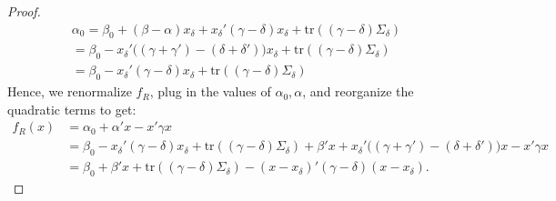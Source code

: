 \documentclass[11pt,dvipsnames]{article}
\newcommand{\trace}{\mathrm{tr}}
\begin{document}
\begin{appendix}
\begin{proof}
\begin{align*}
\alpha_0=\beta_0+(\beta-\alpha)x_\delta + 	x_\delta'(\gamma-\delta) x_\delta + \trace{((\gamma-\delta)\Sigma_\delta)}	
\\
= \beta_0-x_\delta'\big((\gamma+\gamma')-(\delta+\delta')\big)x_\delta + \trace{((\gamma-\delta)\Sigma_\delta)}	
\\
= \beta_0-x_\delta'(\gamma-\delta)x_\delta + \trace{((\gamma-\delta)\Sigma_\delta)}
\end{align*}
Hence, we renormalize $f_R$, plug in the values of $\alpha_0,\alpha$, and reorganize the quadratic terms to get:
\begin{align*}
f_R(x)
&= \alpha_0 + \alpha' x - x'\gamma x
\\
&= \beta_0-x_\delta'(\gamma-\delta)x_\delta + \trace{((\gamma-\delta)\Sigma_\delta)}
+\beta'x + x_\delta'\big((\gamma+\gamma')-(\delta+\delta')\big)x- x'\gamma x
\\
&= \beta_0+\beta'x + \trace{((\gamma-\delta)\Sigma_\delta)} - (x-x_\delta)'(\gamma-\delta)(x-x_\delta).
\end{align*}

\end{proof}


\end{appendix}
\end{document}
